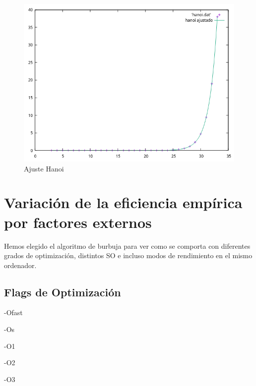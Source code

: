 \documentclass[12pt, spanish]{article}
\begin{document}
\begin{figure}[H]
  \centering
  \includegraphics[scale = 0.9]{AjusteHanoi.png}
  \caption{Ajuste Hanoi}
\end{figure}


\section{Variación de la eficiencia empírica por factores externos}
Hemos elegido el algoritmo de burbuja para ver como se comporta con diferentes grados de optimización, distintos SO e incluso modos de rendimiento en el mismo ordenador.

\subsection{Flags de Optimización}
\begin{table}
\parbox{.45\linewidth}{
\centering

\caption{-Ofast}
}
\hfill
\parbox{.45\linewidth}{
\centering

\caption{-Os}
}
\end{table}

\newpage

\begin{table}[H]
\parbox{.3\linewidth}{
\centering

\caption{-O1}
}
\quad
\parbox{.3\linewidth}{
\centering

\caption{-O2}
}
\quad
\parbox{.3\linewidth}{
\centering

\caption{-O3}
}
\end{table}

\newpage
\end{document}
